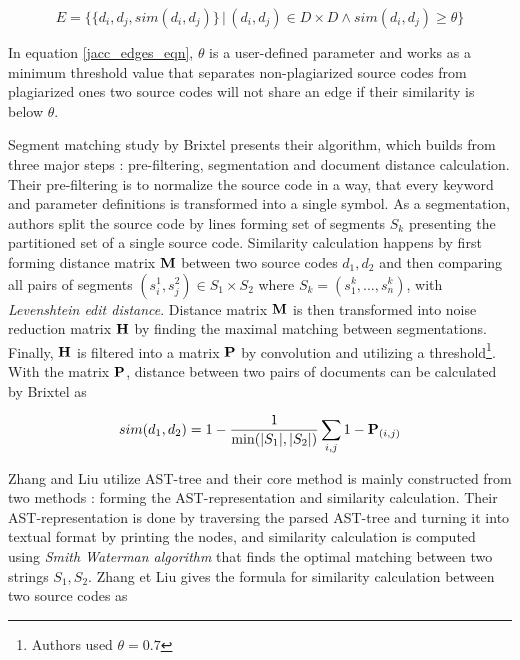 \begin{equation}\label{jacc_edges_eqn}
         E = \Big\{ \{ d_i, d_j, sim(d_i, d_j)\} \, | \, (d_i, d_j) \in D \times D \land sim(d_i, d_j) \geq \theta \Big\}
\end{equation}

\noindent
In equation \ref{jacc_edges_eqn}, $\theta$ is a user-defined parameter and works as a minimum threshold value that separates non-plagiarized source codes from plagiarized ones \ie two source codes will not share an edge if their similarity is below $\theta$.

Segment matching study by Brixtel \etal presents their algorithm, which builds from three major steps \cite{LICD2010}: pre-filtering, segmentation and document distance calculation. Their pre-filtering is to normalize the source code in a way, that every keyword and parameter definitions is transformed into a single symbol. As a segmentation, authors split the source code by lines forming set of segments $S_k$ presenting the partitioned set of a single source code. Similarity calculation happens by first forming distance matrix $\mathbf{M}$ between two source codes $d_1, d_2$ and then comparing all pairs of segments $(s_i^1, s_j^2) \in S_1 \times S_2$ where $S_k = (s_1^k, ..., s_n^k)$, with \emph{Levenshtein edit distance}. Distance matrix $\mathbf{M}$ is then transformed into noise reduction matrix $\mathbf{H}$ by finding the maximal matching between segmentations. Finally, $\mathbf{H}$ is filtered into a matrix $\mathbf{P}$ by convolution and utilizing a threshold\footnote{Authors used $\theta = 0.7$}. With the matrix $\mathbf{P}$, distance between two pairs of documents can be calculated by Brixtel \etal as 

\begin{equation}
    sim(d_1, d_2) = 1 - \dfrac{1}{\min(|S_1|, |S_2|)}\sum_{i, j} 1 - \mathbf{P}_{(i, j)}
\end{equation}

\noindent
Zhang and Liu utilize AST-tree and their core method is mainly constructed from two methods \cite{ASTMLPD2013}: forming the AST-representation and similarity calculation. Their AST-representation is done by traversing the parsed AST-tree and turning it into textual format by printing the nodes, and similarity calculation is computed using \emph{Smith Waterman algorithm} that finds the optimal matching between two strings $S_1, S_2$. Zhang et Liu gives the formula for similarity calculation between two source codes as

